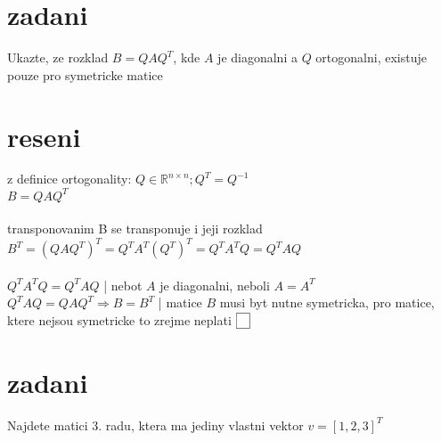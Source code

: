 \documentclass[a4paper]{article}
\begin{document}
\section*{zadani}
Ukazte, ze rozklad $B = QAQ^T$, kde $A$ je diagonalni a
$Q$ ortogonalni, existuje pouze pro symetricke matice

\section*{reseni}
z definice ortogonality: $Q\in\mathbb{R}^{n\times n}; Q^T = Q^{-1}$\\
$B=QAQ^T$
\\\\
transponovanim B se transponuje i jeji rozklad\\
$B^T=(QAQ^T)^T=Q^TA^T(Q^T)^T=Q^TA^TQ=Q^TAQ$
\\\\
$Q^TA^TQ=Q^TAQ$ | nebot $A$ je diagonalni, neboli $A=A^T$ \\
$Q^TAQ = QAQ^T \Rightarrow B = B^T$ | matice $B$ musi byt nutne symetricka, pro matice, ktere nejsou symetricke to zrejme neplati $\fbox{$\phantom{5}$}$\\













\section*{zadani}
Najdete matici 3. radu, ktera ma jediny vlastni vektor $v=[1,2,3]^T$
\end{document}
